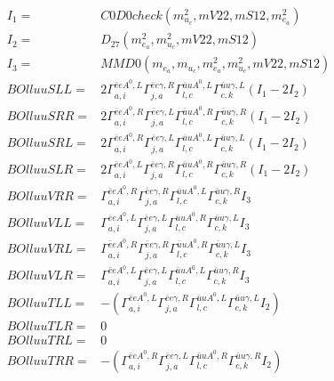 \documentclass[A4,landscape]{article}
\begin{document}
\begin{align} 
I_1 = & C0D0check(m^2_{u_{{c}}}, mV22, mS12, m^2_{e_{{a}}}) \\ 
I_2 = & D_{27}(m^2_{e_{{a}}}, m^2_{u_{{c}}}, mV22, mS12) \\ 
I_3 = & MMD0(m_{e_{{a}}}, m_{u_{{c}}}, m^2_{e_{{a}}}, m^2_{u_{{c}}}, mV22, mS12) \\ 
  BOlluuSLL= & 2  \Gamma^{\bar{e}e A^0 ,L}_{a, i} \Gamma^{\bar{e}e \gamma ,R}_{j, a} \Gamma^{\bar{u}u A^0 ,L}_{l, c} \Gamma^{\bar{u}u \gamma ,L}_{c, k} (I_1 - 2 I_2) \\ 
  BOlluuSRR= & 2  \Gamma^{\bar{e}e A^0 ,R}_{a, i} \Gamma^{\bar{e}e \gamma ,L}_{j, a} \Gamma^{\bar{u}u A^0 ,R}_{l, c} \Gamma^{\bar{u}u \gamma ,R}_{c, k} (I_1 - 2 I_2) \\ 
  BOlluuSRL= & 2  \Gamma^{\bar{e}e A^0 ,R}_{a, i} \Gamma^{\bar{e}e \gamma ,L}_{j, a} \Gamma^{\bar{u}u A^0 ,L}_{l, c} \Gamma^{\bar{u}u \gamma ,L}_{c, k} (I_1 - 2 I_2) \\ 
  BOlluuSLR= & 2  \Gamma^{\bar{e}e A^0 ,L}_{a, i} \Gamma^{\bar{e}e \gamma ,R}_{j, a} \Gamma^{\bar{u}u A^0 ,R}_{l, c} \Gamma^{\bar{u}u \gamma ,R}_{c, k} (I_1 - 2 I_2) \\ 
  BOlluuVRR= &  \Gamma^{\bar{e}e A^0 ,R}_{a, i} \Gamma^{\bar{e}e \gamma ,R}_{j, a} \Gamma^{\bar{u}u A^0 ,L}_{l, c} \Gamma^{\bar{u}u \gamma ,R}_{c, k} I_3 \\ 
  BOlluuVLL= &  \Gamma^{\bar{e}e A^0 ,L}_{a, i} \Gamma^{\bar{e}e \gamma ,L}_{j, a} \Gamma^{\bar{u}u A^0 ,R}_{l, c} \Gamma^{\bar{u}u \gamma ,L}_{c, k} I_3 \\ 
  BOlluuVRL= &  \Gamma^{\bar{e}e A^0 ,R}_{a, i} \Gamma^{\bar{e}e \gamma ,R}_{j, a} \Gamma^{\bar{u}u A^0 ,R}_{l, c} \Gamma^{\bar{u}u \gamma ,L}_{c, k} I_3 \\ 
  BOlluuVLR= &  \Gamma^{\bar{e}e A^0 ,L}_{a, i} \Gamma^{\bar{e}e \gamma ,L}_{j, a} \Gamma^{\bar{u}u A^0 ,L}_{l, c} \Gamma^{\bar{u}u \gamma ,R}_{c, k} I_3 \\ 
  BOlluuTLL= & -( \Gamma^{\bar{e}e A^0 ,L}_{a, i} \Gamma^{\bar{e}e \gamma ,R}_{j, a} \Gamma^{\bar{u}u A^0 ,L}_{l, c} \Gamma^{\bar{u}u \gamma ,L}_{c, k} I_2) \\ 
  BOlluuTLR= & 0 \\ 
  BOlluuTRL= & 0 \\ 
  BOlluuTRR= & -( \Gamma^{\bar{e}e A^0 ,R}_{a, i} \Gamma^{\bar{e}e \gamma ,L}_{j, a} \Gamma^{\bar{u}u A^0 ,R}_{l, c} \Gamma^{\bar{u}u \gamma ,R}_{c, k} I_2) \\ 
\end{align} 
\end{document}
